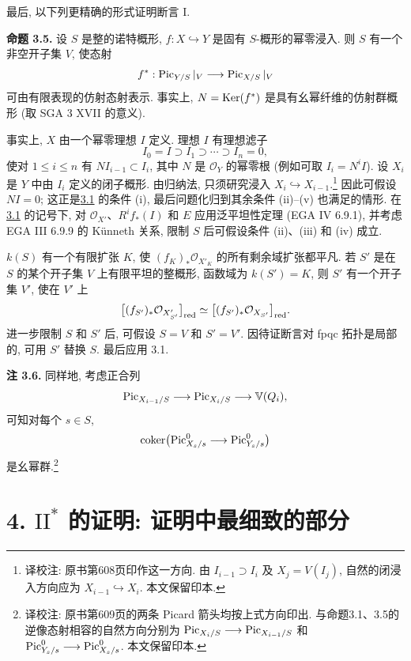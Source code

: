 最后, 以下列更精确的形式证明断言 I.

\textbf{命题 3.5.} 设 $S$ 是整的诺特概形, $f:X\hookrightarrow Y$ 是固有 $S$-概形的幂零浸入. 则 $S$ 有一个非空开子集 $V$, 使态射
\[
  f^*:\operatorname{Pic}_{Y/S}|_V\longrightarrow\operatorname{Pic}_{X/S}|_V
\]
可由有限表现的仿射态射表示. 事实上, $N=\operatorname{Ker}(f^*)$ 是具有幺幂纤维的仿射群概形 (取 SGA 3 XVII 的意义).

事实上, $X$ 由一个幂零理想 $I$ 定义. 理想 $I$ 有理想滤子
\[
  I_0=I\supset I_1\supset\cdots\supset I_n=0,
\]
使对 $1\leq i\leq n$ 有 $NI_{i-1}\subset I_i$, 其中 $N$ 是 $\mathcal O_Y$ 的幂零根 (例如可取 $I_i=N^iI$). 设 $X_i$ 是 $Y$ 中由 $I_i$ 定义的闭子概形. 由归纳法, 只须研究浸入 $X_i\hookrightarrow X_{i-1}$.\footnote{译校注: 原书第608页印作这一方向. 由 $I_{i-1}\supset I_i$ 及 $X_j=V(I_j)$, 自然的闭浸入方向应为 $X_{i-1}\hookrightarrow X_i$. 本文保留印本.} 因此可假设 $NI=0$; 这正是\hyperlink{sga6.e12.prop.3-1}{3.1} 的条件 (i), 最后问题化归到其余条件 (ii)--(v) 也满足的情形. 在\hyperlink{sga6.e12.prop.3-1}{3.1} 的记号下, 对 $\mathcal O_{X'}$、$R^if_*(I)$ 和 $E$ 应用泛平坦性定理 (EGA IV 6.9.1), 并考虑 EGA III 6.9.9 的 K\"unneth 关系, 限制 $S$ 后可假设条件 (ii)、(iii) 和 (iv) 成立.

$k(S)$ 有一个有限扩张 $K$, 使 $(f_K)_*\mathcal O_{X'_K}$ 的所有剩余域扩张都平凡. 若 $S'$ 是在 $S$ 的某个开子集 $V$ 上有限平坦的整概形, 函数域为 $k(S')=K$, 则 $S'$ 有一个开子集 $V'$, 使在 $V'$ 上
\[
  \bigl[(f_{S'})_*\mathcal O_{X'_{S'}}\bigr]_{\mathrm{red}}
  \simeq
  \bigl[(f_{S'})_*\mathcal O_{X_{S'}}\bigr]_{\mathrm{red}}.
\]
进一步限制 $S$ 和 $S'$ 后, 可假设 $S=V$ 和 $S'=V'$. 因待证断言对 fpqc 拓扑是局部的, 可用 $S'$ 替换 $S$. 最后应用 3.1.

\textbf{注 3.6.} 同样地, 考虑正合列
\[
  \operatorname{Pic}_{X_{i-1}/S}\longrightarrow\operatorname{Pic}_{X_i/S}
  \longrightarrow\mathbb V(Q_i),
\]
可知对每个 $s\in S$,
\[
  \operatorname{coker}\bigl(
    \operatorname{Pic}^0_{X_s/s}\longrightarrow\operatorname{Pic}^0_{Y_s/s}
  \bigr)
\]
是幺幂群.\footnote{译校注: 原书第609页的两条 Picard 箭头均按上式方向印出. 与命题3.1、3.5的逆像态射相容的自然方向分别为 $\operatorname{Pic}_{X_i/S}\longrightarrow\operatorname{Pic}_{X_{i-1}/S}$ 和 $\operatorname{Pic}^0_{Y_s/s}\longrightarrow\operatorname{Pic}^0_{X_s/s}$. 本文保留印本.}

\section*{4. $\mathrm{II}^*$ 的证明: 证明中最细致的部分}

